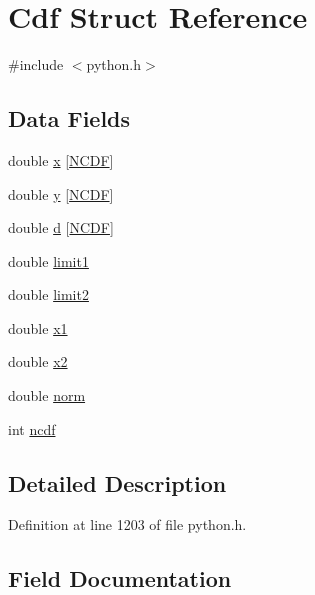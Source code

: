 \hypertarget{struct_cdf}{}\section{Cdf Struct Reference}
\label{struct_cdf}


{\ttfamily \#include $<$python.\+h$>$}

\subsection*{Data Fields}
\begin{DoxyCompactItemize}
\item 
double \hyperlink{struct_cdf_a34302814d1d7d8176fda7a32bf3e6cd1}{x} \mbox{[}\hyperlink{python_8h_a8fcad90a1005b8d2b876efbafa401305}{N\+C\+DF}\mbox{]}
\item 
double \hyperlink{struct_cdf_aa9657822ac7705998c85468c970f1cd7}{y} \mbox{[}\hyperlink{python_8h_a8fcad90a1005b8d2b876efbafa401305}{N\+C\+DF}\mbox{]}
\item 
double \hyperlink{struct_cdf_abdb96d8c6e4f8761f49d769c5251ee35}{d} \mbox{[}\hyperlink{python_8h_a8fcad90a1005b8d2b876efbafa401305}{N\+C\+DF}\mbox{]}
\item 
double \hyperlink{struct_cdf_a3617b232fd381fb21e716c7885b3478a}{limit1}
\item 
double \hyperlink{struct_cdf_abfa2f57780de00749a6a2fc6b2a55aac}{limit2}
\item 
double \hyperlink{struct_cdf_abc6326171a363a5a3a5d6a82009a7194}{x1}
\item 
double \hyperlink{struct_cdf_a1e4ac80d3ed6cfe9da3a64b2aac5752a}{x2}
\item 
double \hyperlink{struct_cdf_a336a610024fec24a921042fb7464dfe9}{norm}
\item 
int \hyperlink{struct_cdf_abc8ea82846fbd30f238131312b3824d0}{ncdf}
\end{DoxyCompactItemize}


\subsection{Detailed Description}


Definition at line 1203 of file python.\+h.



\subsection{Field Documentation}
\mbox{\label{struct_cdf_abdb96d8c6e4f8761f49d769c5251ee35}} 

